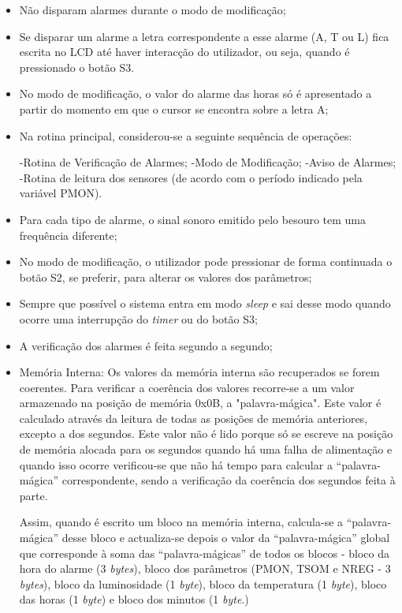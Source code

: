 \documentclass{article}
\begin{document}
		\begin{itemize}
		\item Não disparam alarmes durante o modo de modificação;
		\item Se disparar um alarme a letra correspondente a esse alarme (A, T ou L) fica escrita no LCD até haver interacção do utilizador, ou seja, quando é pressionado o botão S3.
		\item No modo de modificação, o valor do alarme das horas só é apresentado a partir do momento em que o cursor se encontra sobre a letra A;
		\item Na rotina principal, considerou-se a seguinte sequência de operações:
		
			\subitem -Rotina de Verificação de Alarmes;
			\subitem -Modo de Modificação;
			\subitem -Aviso de Alarmes;
			\subitem -Rotina de leitura dos sensores (de acordo com o período indicado pela variável PMON).
		\item Para cada tipo de alarme, o sinal sonoro emitido pelo besouro tem uma frequência diferente; 
		\item No modo de modificação, o utilizador pode pressionar de forma continuada o botão S2, se preferir, para alterar os valores dos parâmetros;
		\item Sempre que possível o sistema entra em modo \textit{sleep} e sai desse modo quando ocorre uma interrupção do \textit{timer} ou do botão S3;
		\item A verificação dos alarmes é feita segundo a segundo;
		\item Memória Interna:
			\subitem Os valores da memória interna são recuperados se forem coerentes. Para verificar a coerência dos valores recorre-se a um valor armazenado na posição de memória 0x0B, a "palavra-mágica". Este valor é calculado através da leitura de todas as posições de memória anteriores, excepto a dos segundos. Este valor não é lido porque só se escreve na posição de memória alocada para os segundos quando há uma falha de alimentação e quando isso ocorre verificou-se que não há tempo para calcular a ``palavra-mágica'' correspondente, sendo a verificação da coerência dos segundos feita à parte. 
			
			Assim, quando é escrito um bloco na memória interna, calcula-se a ``palavra-mágica'' desse bloco e actualiza-se depois o valor da ``palavra-mágica'' global que corresponde à soma das ``palavra-mágicas'' de todos os blocos - bloco da hora do alarme (3 \textit{bytes}), bloco dos parâmetros (PMON, TSOM e NREG - 3 \textit{bytes}), bloco da luminosidade (1 \textit{byte}), bloco da temperatura (1 \textit{byte}), bloco das horas (1 \textit{byte}) e bloco dos minutos (1 \textit{byte}.)
			

\end{itemize}
\end{document}
